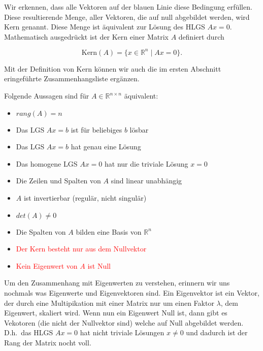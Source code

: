 Wir erkennen, dass alle Vektoren auf der blauen Linie diese Bedingung erfüllen. Diese resultierende Menge, aller Vektoren, die auf null abgebildet werden, wird Kern genannt. Diese Menge ist äquivalent zur Lösung des HLGS \( Ax = 0 \). Mathematisch ausgedrückt ist der Kern einer Matrix \( A \) definiert durch

\begin{equation*}
    \text{Kern}(A) = \{ x \in \mathbb{R}^n \mid Ax = 0 \}.
\end{equation*}

Mit der Definition von Kern können wir auch die im ersten Abschnitt eringeführte Zusammenhangsliste ergänzen. 

\begin{tcolorbox}[colback=gray!30, colframe=gray!80, title=Wichtige Zusammenhänge]
    Folgende Aussagen sind für \( A \in \mathbb{R}^{n \times n} \) äquivalent:
    \begin{itemize}
        \item \(rang (A) = n \)
        \item Das LGS \( Ax=b \) ist für beliebiges \( b \) lösbar
        \item Das LGS \( Ax=b \) hat genau eine Lösung
        \item Das homogene LGS \( Ax=0 \) hat nur die triviale Lösung \( x = 0 \)
        \item Die Zeilen und Spalten von \( A \) sind linear unabhängig
        \item \( A \) ist invertierbar (regulär, nicht singulär)
        \item \( det(A) \neq 0 \)
        \item Die Spalten von \( A \) bilden eine Basis von \( \mathbb{R}^n \)
        \item \textcolor{red}{Der Kern besteht nur aus dem Nullvektor}
        \item \textcolor{red}{Kein Eigenwert von \( A \) ist Null}
    \end{itemize}
\end{tcolorbox}

\vspace{0.5\baselineskip}

Um den Zusammenhang mit Eigenwerten zu verstehen, erinnern wir uns nochmals was Eigenwerte und Eigenvektoren sind. Ein Eigenvektor ist ein Vektor, der durch eine Multipikation mit einer Matrix nur um einen Faktor \( \lambda \), dem Eigenwert, skaliert wird. Wenn nun ein Eigenwert Null ist, dann gibt es Vekotoren (die nicht der Nullvektor sind) welche auf Null abgebildet werden. D.h.\ das HLGS \( Ax = 0 \) hat nicht triviale Lösungen \( x \neq 0 \) und dadurch ist der Rang der Matrix nocht voll.

